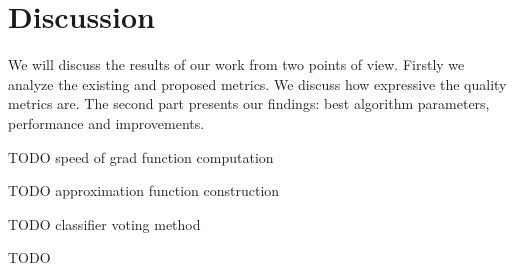 \section{Discussion}\label{sec:DISCUSSION}

We will discuss the results of our work from two points of view.
Firstly we analyze the existing and proposed metrics.
We discuss how expressive the quality metrics are.
The second part presents our findings: best algorithm parameters, performance and improvements.

TODO speed of grad function computation

TODO approximation function construction

TODO classifier voting method

TODO 